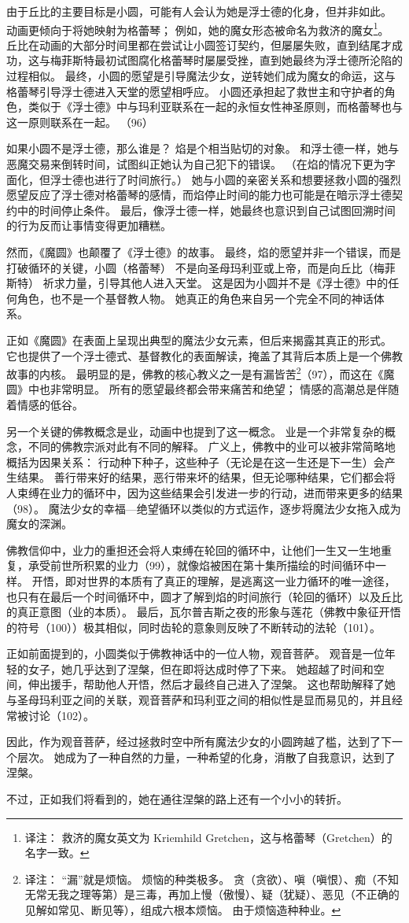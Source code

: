 由于丘比的主要目标是小圆，可能有人会认为她是浮士德的化身，但并非如此。
动画更倾向于将她映射为格蕾琴；
例如，她的魔女形态被命名为救济的魔女\footnote{%
    译注：
    救济的魔女英文为 Kriemhild Gretchen，这与格蕾琴（Gretchen）的名字一致。
}。
丘比在动画的大部分时间里都在尝试让小圆签订契约，但屡屡失败，直到结尾才成功，这与梅菲斯特最初试图腐化格蕾琴时屡屡受挫，直到她最终为浮士德所沦陷的过程相似。
最终，小圆的愿望是引导魔法少女，逆转她们成为魔女的命运，这与格蕾琴引导浮士德进入天堂的愿望相呼应。
小圆还承担起了救世主和守护者的角色，类似于《浮士德》中与玛利亚联系在一起的永恒女性神圣原则，而格蕾琴也与这一原则联系在一起。
（96）

如果小圆不是浮士德，那么谁是？
焰是个相当贴切的对象。
和浮士德一样，她与恶魔交易来倒转时间，试图纠正她认为自己犯下的错误。
（在焰的情况下更为字面化，但浮士德也进行了时间旅行。）
她与小圆的亲密关系和想要拯救小圆的强烈愿望反应了浮士德对格蕾琴的感情，而焰停止时间的能力也可能是在暗示浮士德契约中的时间停止条件。
最后，像浮士德一样，她最终也意识到自己试图回溯时间的行为反而让事情变得更加糟糕。

然而，《魔圆》也颠覆了《浮士德》的故事。
最终，焰的愿望并非一个错误，而是打破循环的关键，小圆（格蕾琴） 不是向圣母玛利亚或上帝，而是向丘比（梅菲斯特） 祈求力量，引导其他人进入天堂。
这是因为小圆并不是《浮士德》中的任何角色，也不是一个基督教人物。
她真正的角色来自另一个完全不同的神话体系。

正如《魔圆》在表面上呈现出典型的魔法少女元素，但后来揭露其真正的形式。
它也提供了一个浮士德式、基督教化的表面解读，掩盖了其背后本质上是一个佛教故事的内核。
最明显的是，佛教的核心教义之一是有漏皆苦\footnote{%
    译注：
    “漏”就是烦恼。
    烦恼的种类极多。
    贪（贪欲）、嗔（嗔恨）、痴（不知无常无我之理等第）是三毒，再加上慢（傲慢）、疑（犹疑）、恶见（不正确的见解如常见、断见等），组成六根本烦恼。
    由于烦恼造种种业。
}（97），而这在《魔圆》中也非常明显。
所有的愿望最终都会带来痛苦和绝望；
情感的高潮总是伴随着情感的低谷。

另一个关键的佛教概念是业，动画中也提到了这一概念。
业是一个非常复杂的概念，不同的佛教宗派对此有不同的解释。
广义上，佛教中的业可以被非常简略地概括为因果关系：
行动种下种子，这些种子（无论是在这一生还是下一生）会产生结果。
善行带来好的结果，恶行带来坏的结果，但无论哪种结果，它们都会将人束缚在业力的循环中，因为这些结果会引发进一步的行动，进而带来更多的结果（98）。
魔法少女的幸福—绝望循环以类似的方式运作，逐步将魔法少女拖入成为魔女的深渊。

佛教信仰中，业力的重担还会将人束缚在轮回的循环中，让他们一生又一生地重复，承受前世所积累的业力（99），就像焰被困在第十集所描绘的时间循环中一样。
开悟，即对世界的本质有了真正的理解，是逃离这一业力循环的唯一途径，也只有在最后一个时间循环中，圆才了解到焰的时间旅行（轮回的循环）以及丘比的真正意图（业的本质）。
最后，瓦尔普吉斯之夜的形象与莲花（佛教中象征开悟的符号（100））极其相似，同时齿轮的意象则反映了不断转动的法轮（101）。

正如前面提到的，小圆类似于佛教神话中的一位人物，观音菩萨。
观音是一位年轻的女子，她几乎达到了涅槃，但在即将达成时停了下来。
她超越了时间和空间，伸出援手，帮助他人开悟，然后才最终自己进入了涅槃。
这也帮助解释了她与圣母玛利亚之间的关联，观音菩萨和玛利亚之间的相似性是显而易见的，并且经常被讨论（102）。

因此，作为观音菩萨，经过拯救时空中所有魔法少女的小圆跨越了槛，达到了下一个层次。
她成为了一种自然的力量，一种希望的化身，消散了自我意识，达到了涅槃。

不过，正如我们将看到的，她在通往涅槃的路上还有一个小小的转折。